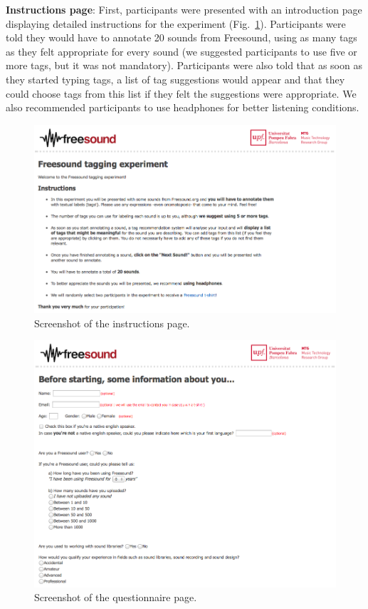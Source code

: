 \begin{description}
  \item \textbf{Instructions page}: First, participants were presented with an introduction page displaying detailed instructions for the experiment (Fig.~\ref{class:fig:ss0_introduction}). Participants were told they would have to annotate 20 sounds from Freesound, using as many tags as they felt appropriate for every sound (we suggested participants to use five or more tags, but it was not mandatory). Participants were also told that as soon as they started typing tags, a list of tag suggestions would appear and that they could choose tags from this list if they felt the suggestions were appropriate. We also recommended participants to use headphones for better listening conditions.

\begin{figure}
  \centering
  \includegraphics[width=1.0\columnwidth]{ch04_class/pics/fig_ss0_instructions.png}
  \caption[Screenshot of the instructions page]{Screenshot of the instructions page.}
  \label{class:fig:ss0_introduction}
\end{figure}

  \begin{figure}
  \centering
  \includegraphics[width=1.0\columnwidth]{ch04_class/pics/fig_ss1_questionnaire.png}
  \caption[Screenshot of the questionnaire page]{Screenshot of the questionnaire page.}
  \label{class:fig:ss1_questionnaire}
\end{figure}


\end{description}
